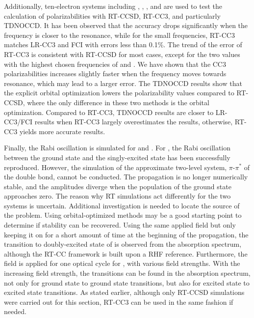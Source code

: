 Additionally, ten-electron systems including , , ,  and  are used to test the calculation of polarizabilities with RT-CCSD, RT-CC3, and particularly TDNOCCD. It has been observed that the accuracy drops significantly when the frequency is closer to the resonance, while for the small frequencies, RT-CC3 matches LR-CC3 and FCI with errors less than 0.1\%. The trend of the error of RT-CC3 is consistent with RT-CCSD for most cases, except for the two values with the highest chosen frequencies of  and . We have shown that the CC3 polarizabilities increases slightly faster when the frequency moves towards resonance, which may lead to a larger error. The TDNOCCD results show that the explicit orbital optimization lowers the polarizability values compared to RT-CCSD, where the only difference in these two methods is the orbital optimization. Compared to RT-CC3, TDNOCCD results are closer to LR-CC3/FCI results when RT-CC3 largely overestimates the results, otherwise, RT-CC3 yields more accurate results. 

Finally, the Rabi oscillation is simulated for  and . For , the Rabi oscillation between the ground state and the singly-excited state has been successfully reproduced. However, the simulation of the approximate two-level system, $\pi$-$\pi^{*}$ of the double bond, cannot be conducted. The propagation is no longer numerically stable, and the amplitudes diverge when the population of the ground state approaches zero. The reason why RT simulations act differently for the two systems is uncertain. Additional investigation is needed to locate the source of the problem. Using orbital-optimized methods may be a good starting point to determine if stability can be recovered. Using the same applied field but only keeping it on for a short amount of time at the beginning of the propagation, the transition to doubly-excited state of  is observed from the absorption spectrum, although the RT-CC framework is built upon a RHF reference. Furthermore, the field is applied for one optical cycle for , with various field strengths. With the increasing field strength, the transitions can be found in the absorption spectrum, not only for ground state to ground state transitions, but also for excited state to excited state transitions. As stated earlier, although only RT-CCSD simulations were carried out for this section, RT-CC3 can be used in the same fashion if needed. 

